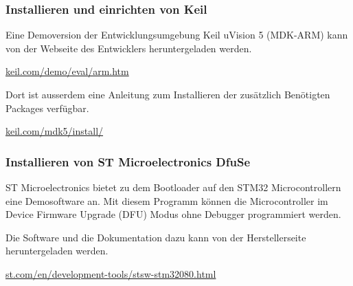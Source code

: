 \subsubsection{Installieren und einrichten von Keil}
\label{sec:KeilInstall}

Eine Demoversion der Entwicklungsumgebung Keil uVision 5 (MDK-ARM) kann von der Webseite des Entwicklers heruntergeladen werden. \cite{Keil-Download}

\href{https://www.keil.com/demo/eval/arm.htm}{keil.com/demo/eval/arm.htm}

Dort ist ausserdem eine Anleitung zum Installieren der zusätzlich Benötigten Packages verfügbar. \cite{Keil-install-guide}

\href{http://www.keil.com/mdk5/install/}{keil.com/mdk5/install/}

\subsubsection{Installieren von ST Microelectronics DfuSe}

ST Microelectronics bietet zu dem Bootloader auf den STM32 Microcontrollern eine Demosoftware an. Mit diesem Programm können die Microcontroller im Device Firmware Upgrade (DFU) Modus ohne Debugger programmiert werden.

Die Software und die Dokumentation dazu kann von der Herstellerseite heruntergeladen werden. \cite{STM32-Download-DFUSE}

\href{https://www.st.com/en/development-tools/stsw-stm32080.html}{st.com/en/development-tools/stsw-stm32080.html}



